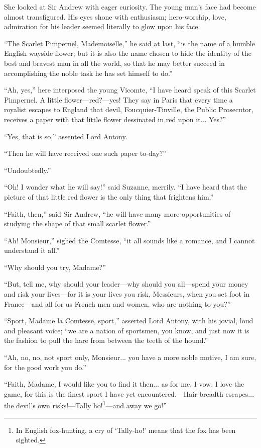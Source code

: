 \documentclass[paper=a5,BCOR=7mm,twoside,DIV=calc,12pt,usegeometry,chapterprefix,endperiod,headings=big]{scrbook}
\begin{document}
She looked at Sir Andrew with eager curiosity. The young man's face had become almost transfigured. His eyes shone with enthusiasm; hero-worship, love, admiration for his leader seemed literally to glow upon his face.

\enquote{The Scarlet Pimpernel, Mademoiselle,} he said at last, \enquote{is the name of a humble English wayside flower; but it is also the name chosen to hide the identity of the best and bravest man in all the world, so that he may better succeed in accomplishing the noble task he has set himself to do.}

\enquote{Ah, yes,} here interposed the young Vicomte, \enquote{I have heard speak of this Scarlet Pimpernel. A little flower---red?---yes! They say in Paris that every time a royalist escapes to England that devil, Foucquier-Tinville, the Public Prosecutor, receives a paper with that little flower dessinated in red upon it... Yes?}

\enquote{Yes, that is so,} assented Lord Antony.

\enquote{Then he will have received one such paper to-day?}

\enquote{Undoubtedly.}

\enquote{Oh! I wonder what he will say!} said Suzanne, merrily. \enquote{I have heard that the picture of that little red flower is the only thing that frightens him.}

\enquote{Faith, then,} said Sir Andrew, \enquote{he will have many more opportunities of studying the shape of that small scarlet flower.}

\enquote{Ah! Monsieur,} sighed the Comtesse, \enquote{it all sounds like a romance, and I cannot understand it all.}

\enquote{Why should you try, Madame?}

\enquote{But, tell me, why should your leader---why should you all---spend your money and risk your lives---for it is your lives you risk, Messieurs, when you set foot in France---and all for us French men and women, who are nothing to you?}

\enquote{Sport, Madame la Comtesse, sport,} asserted Lord Antony, with his jovial, loud and pleasant voice; \enquote{we are a nation of sportsmen, you know, and just now it is the fashion to pull the hare from between the teeth of the hound.}

\enquote{Ah, no, no, not sport only, Monsieur... you have a more noble motive, I am sure, for the good work you do.}

\enquote{Faith, Madame, I would like you to find it then... as for me, I vow, I love the game, for this is the finest sport I have yet encountered.---Hair-breadth escapes... the devil's own risks!---Tally ho!\footnote{In English fox-hunting, a cry of \enquote{Tally-ho!} means that the fox has been sighted.}---and away we go!}
\end{document}
